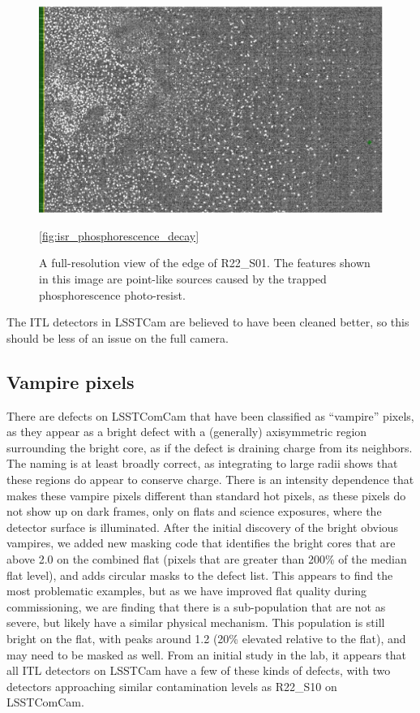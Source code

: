 \begin{figure}
  \includegraphics{figures/isr-f02-phosphorescence_point_like.jpg}
  \caption{A full-resolution view of the edge of R22\_S01.  The features shown in this image are point-like sources caused by the trapped phosphorescence photo-resist.}
  \ref{fig:isr_phosphorescence_decay}
\end{figure}

The ITL detectors in LSSTCam are believed to have been cleaned better, so this should be less of an issue on the full camera.

\subsection{Vampire pixels}

There are defects on LSSTComCam that have been classified as ``vampire'' pixels, as they appear as a bright defect with a (generally) axisymmetric region surrounding the bright core, as if the defect is draining charge from its neighbors.
The naming is at least broadly correct, as integrating to large radii shows that these regions do appear to conserve charge.
There is an intensity dependence that makes these vampire pixels different than standard hot pixels, as these pixels do not show up on dark frames, only on flats and science exposures, where the detector surface is illuminated.
After the initial discovery of the bright obvious vampires, we added new masking code that identifies the bright cores that are above 2.0 on the combined flat (pixels that are greater than 200\% of the median flat level), and adds circular masks to the defect list.
This appears to find the most problematic examples, but as we have improved flat quality during commissioning, we are finding that there is a sub-population that are not as severe, but likely have a similar physical mechanism.
This population is still bright on the flat, with peaks around 1.2 (20\% elevated relative to the flat), and may need to be masked as well.
From an initial study in the lab, it appears that all ITL detectors on LSSTCam have a few of these kinds of defects, with two detectors approaching similar contamination levels as R22\_S10 on LSSTComCam.

